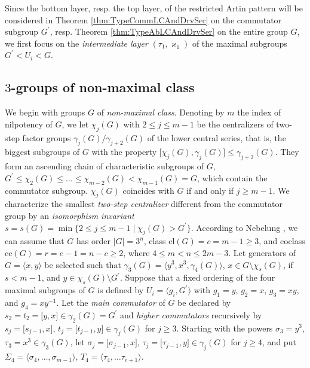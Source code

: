 \documentclass{amsart}
\theoremstyle{definition}
\numberwithin{equation}{section}
\begin{document}
Since the bottom layer, resp. the top layer, of the restricted Artin pattern
will be considered in Theorem
\ref{thm:TypeCommLCAndDrvSer}
on the commutator subgroup \(G^\prime\),
resp. Theorem
\ref{thm:TypeAbLCAndDrvSer}
on the entire group \(G\),
we first focus on the \textit{intermediate layer} \((\tau_1,\varkappa_1)\)
of the maximal subgroups \(G^\prime<U_i<G\).


\subsection{\(3\)-groups of non-maximal class}
\label{ss:NonMaxClass}

We begin with groups \(G\) of \textit{non-maximal class}.
Denoting by \(m\) the index of nilpotency of \(G\),
we let \(\chi_j(G)\) with \(2\le j\le m-1\)
be the centralizers
of two-step factor groups \(\gamma_j(G)/\gamma_{j+2}(G)\)
of the lower central series, that is,
the biggest subgroups of \(G\) with the property
\(\lbrack\chi_j(G),\gamma_j(G)\rbrack\le\gamma_{j+2}(G)\).
They form an ascending chain of characteristic subgroups of \(G\),
\(G^\prime\le\chi_2(G)\le\ldots\le\chi_{m-2}(G)<\chi_{m-1}(G)=G\),
which contain the commutator subgroup.
\(\chi_j(G)\) coincides with \(G\) if and only if \(j\ge m-1\).
We characterize the smallest \textit{two-step centralizer}
different from the commutator group
by an \textit{isomorphism invariant}
\(s=s(G)=\min\lbrace 2\le j\le m-1\mid\chi_j(G)>G^\prime\rbrace\).
According to Nebelung
\cite{Ne},
we can assume that \(G\) has order \(\lvert G\rvert=3^n\),
class \(\mathrm{cl}(G)=c=m-1\ge 3\), and coclass \(\mathrm{cc}(G)=r=e-1=n-c\ge 2\),
where \(4\le m<n\le 2m-3\).
Let generators of \(G=\langle x,y\rangle\) be selected such that
\(\gamma_3(G)=\langle y^3,x^3,\gamma_4(G)\rangle\),
\(x\in G\setminus\chi_s(G)\), if \(s<m-1\),
and \(y\in\chi_s(G)\setminus G^\prime\).
Suppose that a fixed ordering of the four maximal subgroups of \(G\) is defined by
\(U_i=\langle g_i,G^\prime\rangle\) with
\(g_1=y\), \(g_2=x\), \(g_3=xy\), and \(g_4=xy^{-1}\).
Let the \textit{main commutator} of \(G\) be declared by
\(s_2=t_2=\lbrack y,x\rbrack\in\gamma_2(G)=G^\prime\)
and \textit{higher commutators} recursively by
\(s_j=\lbrack s_{j-1},x\rbrack\), \(t_j=\lbrack t_{j-1},y\rbrack\in\gamma_j(G)\)
for \(j\ge 3\).
Starting with the powers \(\sigma_3=y^3\), \(\tau_3=x^3\in\gamma_3(G)\), let
\(\sigma_j=\lbrack\sigma_{j-1},x\rbrack\), \(\tau_j=\lbrack\tau_{j-1},y\rbrack\in\gamma_j(G)\)
for \(j\ge 4\),
and put \(\Sigma_4=\langle\sigma_4,\ldots,\sigma_{m-1}\rangle\),
\(T_4=\langle\tau_4,\ldots\tau_{e+1}\rangle\).
\end{document}
